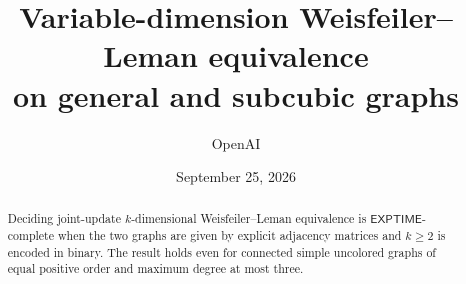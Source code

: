 \documentclass[11pt]{article}
\title{Variable-dimension Weisfeiler--Leman equivalence\\on general and subcubic graphs}
\author{OpenAI}
\date{September 25, 2026}
\theoremstyle{definition}
\newcommand{\EXPTIME}{\mathsf{EXPTIME}}
\begin{document}
\maketitle
\begin{abstract}
Deciding joint-update \(k\)-dimensional Weisfeiler--Leman equivalence is
\(\EXPTIME\)-complete when the two graphs are given by explicit adjacency
matrices and \(k\ge2\) is encoded in binary. The result holds even for
connected simple uncolored graphs of equal positive order and maximum
degree at most three.
\end{abstract}
{\footnotesize\tableofcontents}










\end{document}
